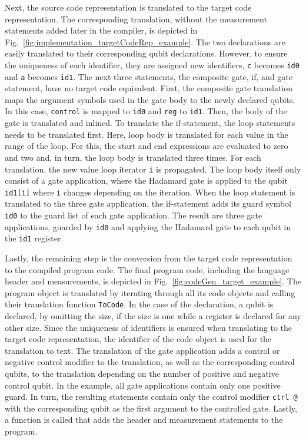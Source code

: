 Next, the source code representation is translated to the target code representation. The corresponding translation, without the measurement statements added later in the compiler, is depicted in Fig.~\ref{fig:implementation_targetCodeRep_example}. The two declarations are easily translated to their corresponding qubit declarations. However, to ensure the uniqueness of each identifier, they are assigned new identifiers, \texttt{c} becomes \texttt{id0} and \texttt{a} becomes \texttt{id1}. The next three statements, the composite gate, if, and gate statement, have no target code equivalent. First, the composite gate translation maps the argument symbols used in the gate body to the newly declared qubits. In this case, \texttt{control} is mapped to \texttt{id0} and \texttt{reg} to \texttt{id1}. Then, the body of the gate is translated and inlined. To translate the if-statement, the loop statements needs to be translated first. Here, loop body is translated for each value in the range of the loop. For this, the start and end expressions are evaluated to zero and two and, in turn, the loop body is translated three times. For each translation, the new value loop iterator \texttt{i} is propagated. The loop body itself only consist of a gate application, where the Hadamard gate is applied to the qubit \texttt{id1[i]} where \texttt{i} changes depending on the iteration. When the loop statement is translated to the three gate application, the if-statement adds its guard symbol \texttt{id0} to the guard list of each gate application. The result are three gate applications, guarded by \texttt{id0} and applying the Hadamard gate to each qubit in the \texttt{id1} register.

Lastly, the remaining step is the conversion from the target code representation to the compiled program code. The final program code, including the language header and measurements, is depicted in Fig.~\ref{fig:codeGen_target_example}. The program object is translated by iterating through all its code objects and calling their translation function \texttt{ToCode}. In the case of the declaration, a qubit is declared, by omitting the size, if the size is one while a register is declared for any other size. Since the uniqueness of identifiers is ensured when translating to the target code representation, the identifier of the code object is used for the translation to text. The translation of the gate application adds a control or negative control modifier to the translation, as well as the corresponding control qubits, to the translation depending on the number of positive and negative control qubit. In the example, all gate applications contain only one positive guard. In turn, the resulting statements contain only the control modifier \texttt{ctrl @} with the corresponding qubit as the first argument to the controlled gate. Lastly, a function is called that adds the header and measurement statements to the program.  

